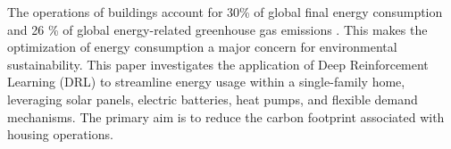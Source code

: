 The operations of buildings account for 30\% of global final energy consumption and 26 \% of global energy-related greenhouse gas emissions \cite{IEA.06.01.2024}. This makes the optimization of energy consumption a major concern for environmental sustainability. This paper investigates the application of Deep Reinforcement Learning (DRL) to streamline energy usage within a single-family home, leveraging solar panels, electric batteries, heat pumps, and flexible demand mechanisms. The primary aim is to reduce the carbon footprint associated with housing operations.